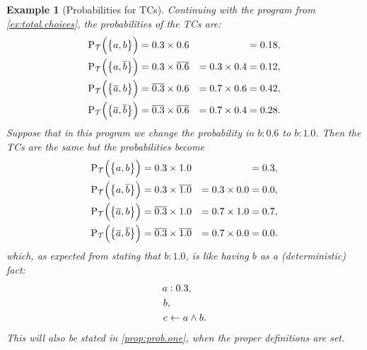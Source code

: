 \documentclass{tlp}
\newtheorem{example}{Example}
\newcommand{\eat}[1]{}
\newcommand{\at}[1]{\ensuremath{\!\del{#1}}}        %
\newcommand{\cla}[1]{\ensuremath{{\cal #1}}}        %
\newcommand{\clause}{\ensuremath{\leftarrow}}
\newcommand{\co}[1]{\ensuremath{\overline{#1}}}     %
\newcommand{\TCHOICEset}{\ensuremath{\cla{T}}}
\newcommand{\prfunc}{\ensuremath{\mathrm{P}}}
\newcommand{\prd}[1]{\ensuremath{\prfunc_{#1}}}
\newcommand{\prT}{\prd{\TCHOICEset}}
\newcommand{\probfact}[2]{\ensuremath{#1:#2}}
\begin{document}
\begin{example}[Probabilities for \aclp{TC}]%
  \label{ex:probability.total.choices}%
  \em Continuing with the program from \cref{ex:total.choices}, the
  probabilities of the \aclp{TC} are:
  \begin{equation*}
    \begin{aligned}
            \prT\at{\set[1]{a, b}}           & = 0.3 \times 0.6           &                  & = 0.18, \\
            \prT\at{\set[1]{a, \co{b}}}      & = 0.3 \times \co{0.6}      & = 0.3 \times 0.4 & = 0.12, \\
            \prT\at{\set[1]{\co{a}, b}}      & = \co{0.3} \times 0.6      & = 0.7 \times 0.6 & = 0.42, \\
            \prT\at{\set[1]{\co{a}, \co{b}}} & = \co{0.3} \times \co{0.6} & = 0.7 \times 0.4 & = 0.28.
    \end{aligned}
  \end{equation*}
  \eat{ The total choices corresponding to the stable models of the
    program above are \( \co{a}\co{b}\co{c}, ab\co{c}, a\co{b}c. \)
    The probability of $t = \co{a}\co{b}\co{c}$ is \(0.7\) ? } %
  Suppose that in this program we change the probability in
  \(\probfact{b}{0.6}\) to \(\probfact{b}{1.0}\).  Then the \aclp{TC}
  are the same but the probabilities become
  \begin{equation*}
    \begin{aligned}
            \prT\at{\set[1]{a, b}}           & = 0.3 \times 1.0           &                  & = 0.3, \\
            \prT\at{\set[1]{a, \co{b}}}      & = 0.3 \times \co{1.0}      & = 0.3 \times 0.0 & = 0.0, \\
            \prT\at{\set[1]{\co{a}, b}}      & = \co{0.3} \times 1.0      & = 0.7 \times 1.0 & = 0.7, \\
            \prT\at{\set[1]{\co{a}, \co{b}}} & = \co{0.3} \times \co{1.0} & = 0.7 \times 0.0 & = 0.0.
    \end{aligned}
  \end{equation*}
  which, as expected from stating that \(\probfact{b}{1.0}\), is like
  having \(b\) as a (deterministic) fact:
  \begin{equation*}
    \begin{split}
            \probfact{a&}{0.3}, \\
            b &, \\
            c & \clause a \wedge b.
    \end{split}
  \end{equation*}
  This will also be stated in \cref{prop:prob.one}, when the proper
  definitions are set.
\end{example}
\end{document}
